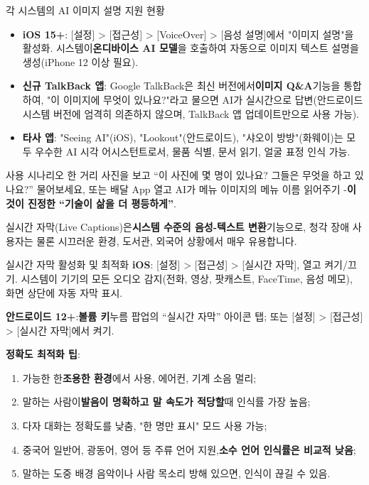 \begin{tcbinfo}{각 시스템의 AI 이미지 설명 지원 현황}
\begin{itemize}
  \item \textbf{iOS 15+}: [설정] > [접근성] > [VoiceOver] > [음성 설명]에서 "이미지 설명"을 활성화. 시스템이\textbf{온디바이스 AI 모델}을 호출하여 자동으로 이미지 텍스트 설명을 생성(iPhone 12 이상 필요).
  \item \textbf{신규 TalkBack 앱}: Google TalkBack은 최신 버전에서\textbf{이미지 Q\&A}기능을 통합하여, "이 이미지에 무엇이 있나요?"라고 물으면 AI가 실시간으로 답변(안드로이드 시스템 버전에 엄격히 의존하지 않으며, TalkBack 앱 업데이트만으로 사용 가능).
  \item \textbf{타사 앱}: "Seeing AI"(iOS), "Lookout"(안드로이드), "샤오이 방방"(화웨이)는 모두 우수한 AI 시각 어시스턴트로서, 물품 식별, 문서 읽기, 얼굴 표정 인식 가능.
\end{itemize}

\end{tcbinfo}

\begin{tcbpractice}{사용 시나리오}
한 거리 사진을 보고 “이 사진에 몇 명이 있나요? 그들은 무엇을 하고 있나요?” 물어보세요, 또는 배달 App 열고 AI가 메뉴 이미지의 메뉴 이름 읽어주기 -\textbf{이것이 진정한 “기술이 삶을 더 평등하게”}.

\end{tcbpractice}


실시간 자막(Live Captions)은\textbf{시스템 수준의 음성-텍스트 변환}기능으로, 청각 장애 사용자는 물론 시끄러운 환경, 도서관, 외국어 상황에서 매우 유용합니다.

\begin{tcbinfo}{실시간 자막 활성화 및 최적화}
\textbf{iOS}: [설정] > [접근성] > [실시간 자막], 열고 켜기/끄기. 시스템이 기기의 모든 오디오 감지(전화, 영상, 팟캐스트, FaceTime, 음성 메모), 화면 상단에 자동 자막 표시.

\textbf{안드로이드 12+}:\textbf{볼륨 키}누름 팝업의 “실시간 자막” 아이콘 탭; 또는 [설정] > [접근성] > [실시간 자막]에서 켜기.

\textbf{정확도 최적화 팁}:

\begin{enumerate}
  \item 가능한 한\textbf{조용한 환경}에서 사용, 에어컨, 기계 소음 멀리;
  \item 말하는 사람이\textbf{발음이 명확하고 말 속도가 적당할}때 인식률 가장 높음;
  \item 다자 대화는 정확도를 낮춤, "한 명만 표시" 모드 사용 가능;
  \item 중국어 일반어, 광동어, 영어 등 주류 언어 지원,\textbf{소수 언어 인식률은 비교적 낮음};
  \item 말하는 도중 배경 음악이나 사람 목소리 방해 있으면, 인식이 끊길 수 있음.
\end{enumerate}

\end{tcbinfo}

